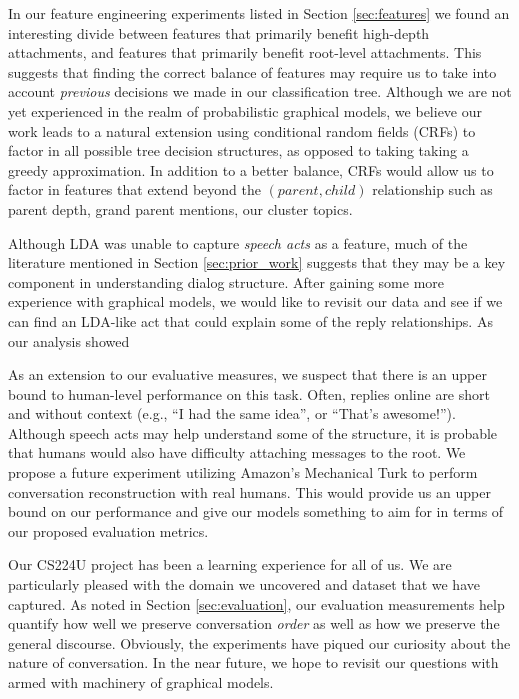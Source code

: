 \documentclass{article}
\begin{document}
In our feature engineering experiments listed in Section \ref{sec:features} we
found an interesting divide between features that primarily benefit high-depth
attachments, and features that primarily benefit root-level attachments. This
suggests that finding the correct balance of features may require us to take
into account \textit{previous} decisions we made in our classification tree.
Although we are not yet experienced in the realm of probabilistic graphical
models, we believe our work leads to a natural extension using conditional
random fields (CRFs) to factor in all possible tree decision structures, as
opposed to taking taking a greedy approximation. In addition to a better
balance, CRFs would allow us to factor in features that extend beyond the
$(parent,child)$ relationship such as parent depth, grand parent mentions, our
cluster topics.

Although LDA was unable to capture \textit{speech acts} as a feature, much of
the literature mentioned in Section \ref{sec:prior_work} suggests that they
may be a key component in understanding dialog structure. After gaining some
more experience with graphical models, we would like to revisit our data and
see if we can find an LDA-like act that could explain some of the reply
relationships. As our analysis showed

As an extension to our evaluative measures, we suspect that there is an upper
bound to human-level performance on this task. Often, replies online are short
and without context (e.g., ``I had the same idea'', or ``That's awesome!'').
Although speech acts may help understand some of the structure, it is probable
that humans would also have difficulty attaching messages to the root. We
propose a future experiment utilizing Amazon's Mechanical Turk to perform
conversation reconstruction with real humans. This would provide us an upper
bound on our performance and give our models something to aim for in terms of
our proposed evaluation metrics.

Our CS224U project has been a learning experience for all of us. We are
particularly pleased with the domain we uncovered and dataset that we have
captured. As noted in Section \ref{sec:evaluation}, our evaluation
measurements help quantify how well we preserve conversation \textit{order} as
well as how we preserve the general discourse. Obviously, the experiments have
piqued our curiosity about the nature of conversation. In the near future, we
hope to revisit our questions with armed with machinery of graphical models.

{} 

\end{document}
